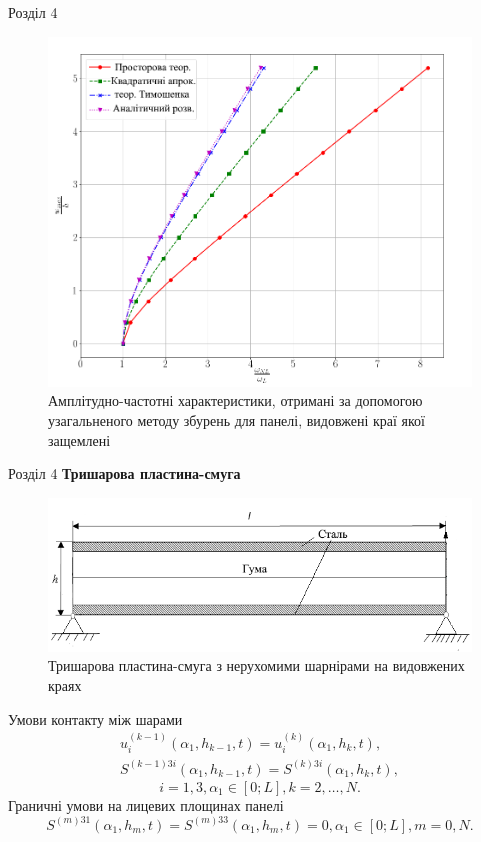 \documentclass[8pt]{beamer}
\numberwithin{figure}{section}
\numberwithin{equation}{section}
\numberwithin{table}{section}
\begin{document}
\begin{frame}{Розділ 4}

\begin{figure}
	\includegraphics[scale=0.3]{pic/AFRC1ukr2.png}
		\caption{Амплітудно-частотні характеристики, отримані за допомогою узагальненого методу збурень для панелі, видовжені краї якої защемлені}
		\label{fig:AFR_C}
\end{figure}


\end{frame}

\begin{frame}{Розділ 4}
\textbf{Тришарова пластина-смуга}

\begin{figure}
	\includegraphics[scale=0.4]{pic/plate3layers_ukr.png}
		\caption{Тришарова пластина-смуга з нерухомими шарнірами на видовжених краях}
\end{figure}

Умови контакту між шарами
\begin{gather}
u_i^{(k-1)}\left(\alpha_1, h_{k-1},t \right)=u_i^{(k)}\left(\alpha_1, h_{k},t \right),\\
S^{(k-1)3i}\left(\alpha_1, h_{k-1},t \right)=S^{(k)3i}\left(\alpha_1, h_{k},t \right),
\end{gather}
\[ i=1,3, \alpha_1 \in [0;L], k=2,\dots,N.\]
Граничні умови на лицевих площинах панелі
\begin{equation}
S^{(m)31}\left(\alpha_1, h_{m},t \right)=S^{(m)33}\left(\alpha_1, h_{m},t \right)=0,\alpha_1 \in [0;L], m=0,N.
\end{equation}

\end{frame}
\end{document}
